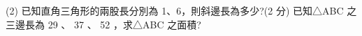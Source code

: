 \documentclass
[answers]
{exam}
\theoremstyle{definition}
\newif\ifyr\yrfalse %
\newcommand{\yr}[1]{\ifyr\relax\else #1\fi}
\newif\ifsho\shofalse %
\newcommand{\sho}[1]{\ifsho\relax\else\rightline{【#1】}\fi}
\begin{document}
\begin{questions}
\question

\begin{tasks}(2)
	\task 已知直角三角形的兩股長分別為 1、6，則斜邊長為多少?(2 分)
	\task 已知△ABC 之三邊長為 29 、 37 、 52 ，求△ABC 之面積?
\end{tasks}



\begin{solution}~\\
	
\end{solution}

\begin{tasks}

\end{tasks}


\end{questions}
\end{document}
